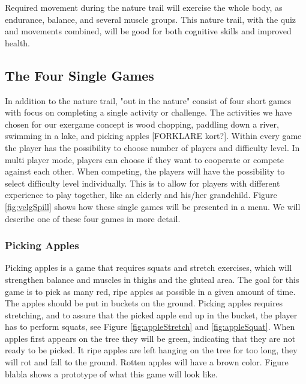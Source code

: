 Required movement during the nature trail will exercise the whole body, as endurance, balance, and several muscle groups. This nature trail, with the quiz and movements combined, will be good for both cognitive skills and improved health.       



\subsection{The Four Single Games}
In addition to the nature trail, "out in the nature" consist of four short games with focus on completing a single activity or challenge. The activities we have chosen for our exergame concept is wood chopping, paddling down a river, swimming in a lake, and picking apples [FORKLARE kort?]. Within every game the player has the possibility to choose number of players and difficulty level. In multi player mode, players can choose if they want to cooperate or compete against each other. When competing, the players will have the possibility to select difficulty level individually. This is to allow for players with different experience to play together, like an elderly and his/her grandchild. Figure \ref{fig:velgSpill} shows how these single games will be presented in a menu. We will describe one of these four games in more detail.

\subsubsection{Picking Apples}
Picking apples is a game that requires squats and stretch exercises, which will strengthen balance and muscles in thighs and the gluteal area. The goal for this game is to pick as many red, ripe apples as possible in a given amount of time. The apples should be put in buckets on the ground. Picking apples requires stretching, and to assure that the picked apple end up in the bucket, the player has to perform squats, see Figure \ref{fig:appleStretch} and \ref{fig:appleSquat}. When apples first appears on the tree they will be green, indicating that they are not ready to be picked. It ripe apples are left hanging on the tree for too long, they will rot and fall to the ground. Rotten apples will have a brown color. Figure blabla shows a prototype of what this game will look like.  

